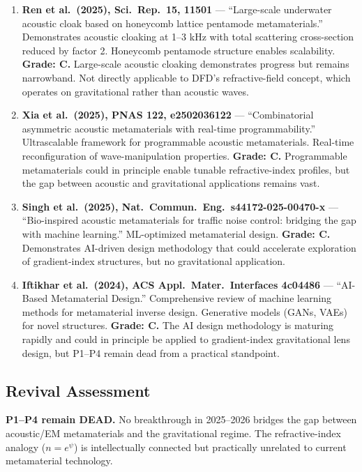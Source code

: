 \documentclass[11pt,a4paper]{article}
\begin{document}
\begin{enumerate}

\item \textbf{Ren et al.\ (2025), Sci.\ Rep.\ 15, 11501} --- ``Large-scale underwater acoustic cloak based on honeycomb lattice pentamode metamaterials.'' Demonstrates acoustic cloaking at 1--3 kHz with total scattering cross-section reduced by factor 2. Honeycomb pentamode structure enables scalability. \textbf{Grade: C.} Large-scale acoustic cloaking demonstrates progress but remains narrowband. Not directly applicable to DFD's refractive-field concept, which operates on gravitational rather than acoustic waves.

\item \textbf{Xia et al.\ (2025), PNAS 122, e2502036122} --- ``Combinatorial asymmetric acoustic metamaterials with real-time programmability.'' Ultrascalable framework for programmable acoustic metamaterials. Real-time reconfiguration of wave-manipulation properties. \textbf{Grade: C.} Programmable metamaterials could in principle enable tunable refractive-index profiles, but the gap between acoustic and gravitational applications remains vast.

\item \textbf{Singh et al.\ (2025), Nat.\ Commun.\ Eng.\ s44172-025-00470-x} --- ``Bio-inspired acoustic metamaterials for traffic noise control: bridging the gap with machine learning.'' ML-optimized metamaterial design. \textbf{Grade: C.} Demonstrates AI-driven design methodology that could accelerate exploration of gradient-index structures, but no gravitational application.

\item \textbf{Iftikhar et al.\ (2024), ACS Appl.\ Mater.\ Interfaces 4c04486} --- ``AI-Based Metamaterial Design.'' Comprehensive review of machine learning methods for metamaterial inverse design. Generative models (GANs, VAEs) for novel structures. \textbf{Grade: C.} The AI design methodology is maturing rapidly and could in principle be applied to gradient-index gravitational lens design, but P1--P4 remain dead from a practical standpoint.

\end{enumerate}

\subsection{Revival Assessment}
\textbf{P1--P4 remain DEAD.} No breakthrough in 2025--2026 bridges the gap between acoustic/EM metamaterials and the gravitational regime. The refractive-index analogy ($n = e^\psi$) is intellectually connected but practically unrelated to current metamaterial technology.
\end{document}
